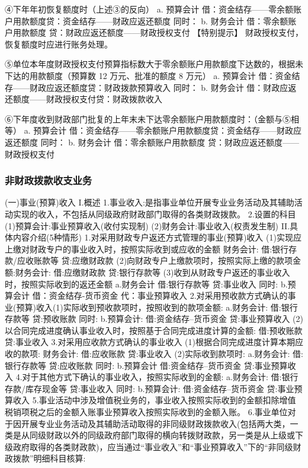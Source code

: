 \documentclass[UTF8,12pt]{ctexart}
\numberwithin{equation}{section} %
\numberwithin{figure}{section}
\numberwithin{table}{section}
\begin{document}
	④下年年初恢复额度时（上述③的反向）
	a.	预算会计
	借：资金结存——零余额账户用款额度贷：资金结存——财政应返还额度
	同时：
	b.	财务会计
	借：零余额账户用款额度
	贷：财政应返还额度——财政授权支付
	【特别提示】
	财政授权支付，恢复额度时应进行账务处理。
	
	⑤单位本年度财政授权支付预算指标数大于零余额账户用款额度下达数的，根据未下达的用款额度（预算数 12 万元、批准的额度 8 万元）
	a.	预算会计
	借：资金结存——财政应返还额度贷：财政拨款预算收入
	同时：
	b.	财务会计
	借：财政应返还额度——财政授权支付贷：财政拨款收入
	
	⑥下年度收到财政部门批复的上年末未下达零余额账户用款额度时：（金额与⑤相等）
	a.	预算会计
	借：资金结存——零余额账户用款额度贷：资金结存——财政应返还额度
	同时：
	b.	财务会计
	借：零余额账户用款额度
	贷：财政应返还额度——财政授权支付
	
	\subsubsection{非财政拨款收支业务}
	(一)事业(预算)收入
	I.概述
	1.事业收入:是指事业单位开展专业业务活动及其辅助活动实现的收入，不包括从同级政府财政部门取得的各类财政拨款。
	2.设置的科目
	(1)预算会计:事业预算收入(收付实现制)
	(2)财务会计:事业收入(权责发生制)
	II.具体内容介绍(5种情形)
	1.对采用财政专户返还方式管理的事业(预算)收入
	(1)实现应上缴对财政专户的事业收入时，按照实际收到或应收的金额
	财务会计:
	借:银行存款/应收账款等
	贷:应缴财政款
	(2)向财政专户上缴款项时，按照实际上缴的款项金额:财务会计:
	借:应缴财政款
	贷:银行存款等
	(3)收到从财政专户返还的事业收入时，按照实际收到的返还金额
	a.财务会计
	借:银行存款等
	贷:事业收入
	同时:
	b.预算会计
	借：资金结存-货币资金
	代：事业预算收入
	2.对采用预收款方式确认的事业(预算)收入(1)实际收到预收款项时，按照收到的款项金额:
	a.财务会计:
	借:银行存款等
	贷:预收账款
	同时:
	b.预算会计:
	借:资金结存--货币资金
	贷:事业预算收入
	(2)以合同完成进度确认事业收入时，按照基于合同完成进度计算的金额:
	借:预收账款
	贷:事业收入
	3.对采用应收款方式确认的事业收入
	(1)根据合同完成进度计算本期应收的款项:
	财务会计:
	借:应收账款
	贷:事业收入
	(2)实际收到款项时:
	a.财务会计:
	借:银行存款等
	贷:应收账款
	同时:
	b.预算会计
	借:资金结存--货币资金
	贷:事业预算收入
	4.对于其他方式下确认的事业收入，按照实际收到的金额:
	a.财务会计:
	借:银行存款/库存现金等
	贷:事业收入
	同时:
	b.预算会计:
	借:资金结存--货币资金
	贷:事业预算收入
	5.事业活动中涉及增值税业务的，事业收入按照实际收到的金额扣除增值税销项税之后的金额入账事业预算收入按照实际收到的金额入账。
	6.事业单位对于因开展专业业务活动及其辅助活动取得的非同级财政拨款收入(包括两大类，一类是从同级财政以外的同级政府部门取得的横向转拨财政款，另一类是从上级或下级政府取得的各类财政款)，应当通过“事业收入”和“事业预算收入”下的“非同级财政拨款”明细科目核算:
\end{document}
